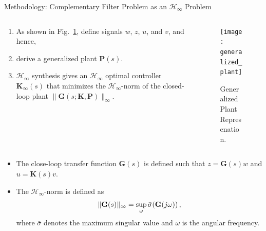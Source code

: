 \documentclass{beamer}
\begin{document}
\begin{frame}[t]
\begin{columns}[t]
\begin{column}{0.32\linewidth}
\begin{block}{Methodology: Complementary Filter Problem as an $\mathcal{H}_\infty$ Problem}
					\begin{columns}[t, onlytextwidth]
						\begin{column}{0.5\textwidth}
							\begin{enumerate}
								\item As shown in Fig.~\ref{fig:generalized_plant_representation}, define signals $w$, $z$, $u$, and $v$, and hence,
								\item derive a generalized plant $\mathbf{P}(s)$.
								\item $\mathcal{H}_\infty$ synthesis gives an $\mathcal{H}_\infty$ optimal controller $\mathbf{K}_\infty(s)$ that minimizes the $\mathcal{H}_\infty$-norm of the closed-loop plant $\lVert\mathbf{G}(s;\mathbf{K},\mathbf{P})\rVert_\infty$.
							\end{enumerate}
						\end{column}
						\begin{column}{0.5\textwidth}
							\begin{figure}
								\centering
								\texttt{[image: generalized\_plant]}
								\caption{Generalized Plant Represenation. }
								\label{fig:generalized_plant_representation}
							\end{figure}
						\end{column}
					\end{columns}
				
					\medskip
					
					\begin{itemize}
						\item The close-loop transfer function $\mathbf{G}(s)$ is defined such that $z=\mathbf{G}(s)w$ and $u=\mathbf{K}(s)v$.
						\item The $\mathcal{H}_\infty$-norm is defined as
						\begin{equation}
							\lVert \mathbf{G}(s) \rVert_\infty = \sup_\omega\bar\sigma \mleft(\mathbf{G}(j\omega)\mright)\,,
						\end{equation}
						where $\bar\sigma$ denotes the maximum singular value and $\omega$ is the angular frequency.
					\end{itemize}

					
		
			
			\end{block}
		\end{column}
		

\end{columns}
\end{frame}
\end{document}
